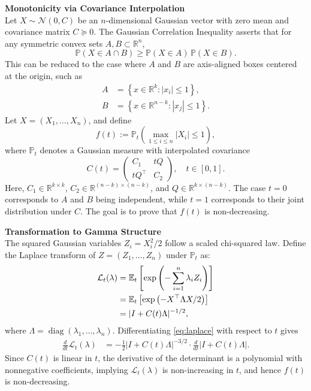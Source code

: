 \begin{technical}
{\Large\textbf{Monotonicity via Covariance Interpolation}}\\[0.7em]

Let \( X \sim \mathcal{N}(0, C) \) be an \( n \)-dimensional Gaussian vector with zero mean and covariance matrix \( C \succcurlyeq 0 \). The Gaussian Correlation Inequality asserts that for any symmetric convex sets \( A, B \subset \mathbb{R}^n \),
\[
\mathbb{P}(X \in A \cap B) \ge \mathbb{P}(X \in A)\,\mathbb{P}(X \in B).
\]
This can be reduced to the case where \( A \) and \( B \) are axis-aligned boxes centered at the origin, such as
\begin{align}
A &= \left\{ x \in \mathbb{R}^k : |x_i| \le 1 \right\}, \quad\\
B &= \left\{ x \in \mathbb{R}^{n-k} : |x_j| \le 1 \right\}.
\end{align}
Let \( X = (X_1, \dots, X_n) \), and define
\[
f(t) := \mathbb{P}_t\left( \max_{1 \le i \le n} |X_i| \le 1 \right),
\]
where \( \mathbb{P}_t \) denotes a Gaussian measure with interpolated covariance
\[
C(t) = 
\begin{pmatrix}
C_1 & tQ \\
tQ^\top & C_2
\end{pmatrix}, \quad t \in [0,1].
\]
Here, \( C_1 \in \mathbb{R}^{k \times k} \), \( C_2 \in \mathbb{R}^{(n-k) \times (n-k)} \), and \( Q \in \mathbb{R}^{k \times (n-k)} \). The case \( t = 0 \) corresponds to \( A \) and \( B \) being independent, while \( t = 1 \) corresponds to their joint distribution under \( C \). The goal is to prove that \( f(t) \) is non-decreasing.

\noindent\textbf{Transformation to Gamma Structure}\\[0.5em]
The squared Gaussian variables \( Z_i = X_i^2 / 2 \) follow a scaled chi-squared law. Define the Laplace transform of \( Z = (Z_1, \dots, Z_n) \) under \( \mathbb{P}_t \) as:
\begin{align}
\mathcal{L}_t(\lambda) 
&= \mathbb{E}_t \left[ \exp\left( -\sum_{i=1}^n \lambda_i Z_i \right) \right] \notag \\
&= \mathbb{E}_t \left[ \exp\left( -X^\top \Lambda X / 2 \right) \right] \notag \\
&= |I + C(t) \Lambda|^{-1/2}, \label{eq:laplace}
\end{align}
where \( \Lambda = \operatorname{diag}(\lambda_1, \dots, \lambda_n) \). Differentiating \eqref{eq:laplace} with respect to \( t \) gives
\begin{align}
\frac{d}{dt} \mathcal{L}_t(\lambda) 
&= -\frac{1}{2} |I + C(t)\Lambda|^{-3/2} \cdot \frac{d}{dt} |I + C(t)\Lambda|. \label{eq:laplace-deriv}
\end{align}
Since \( C(t) \) is linear in \( t \), the derivative of the determinant is a polynomial with nonnegative coefficients, implying \( \mathcal{L}_t(\lambda) \) is non-increasing in \( t \), and hence \( f(t) \) is non-decreasing.


\end{technical}
